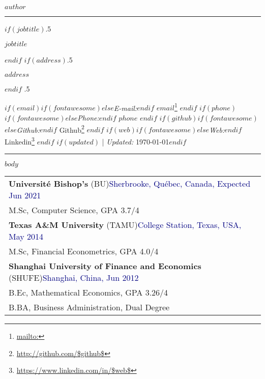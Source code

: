 \documentclass[$if(fontsize)$$fontsize$,$endif$$if(lang)$$babel-lang$,$endif$$if(papersize)$$papersize$paper,$endif$$for(classoption)$$classoption$$sep$,$endfor$]{$documentclass$}
\renewcommand{\href}[2]{#2\footnote{\url{#1}}}
\begin{document}
\centerline{\huge \bf $author$}

\vspace{2 mm}

\hrule

\vspace{2 mm}

$if(jobtitle)$\moveleft.5\hoffset\centerline{$jobtitle$}$endif$
$if(address)$\moveleft.5\hoffset\centerline{$address$}$endif$
\moveleft.5\hoffset\centerline{
$if(email)$$if(fontawesome)$\faEnvelopeO \hspace{1 mm}$else$\emph{E-mail:}$endif$ \href{mailto:}{$email$} \hspace{1 mm}$endif$ $if(phone)$$if(fontawesome)$\faPhone \hspace{1 mm}$else$\emph{Phone:}$endif$  $phone$  \hspace{1 mm} $endif$ $if(github)$$if(fontawesome)$\faGithub \hspace{1 mm}$else$\emph{Github:}$endif$ \href{http://github.com/$github$}{Github} \hspace{1 mm} $endif$ $if(web)$$if(fontawesome)$\faGlobe \hspace{1 mm}$else$\emph{Web:}$endif$ \href{https://www.linkedin.com/in/$web$}{Linkedin}  $endif$
$if(updated)$ | \emph{Updated:} \today$endif$}

\vspace{2 mm}

\hrule


$body$  %



\begin{tabular}{p{19.4cm}}
    \rule{0pt}{2mm} \textbf{Université Bishop's} \small(BU)\normalsize \hfill \textcolor{Navy}{Sherbrooke, Québec, Canada, Expected Jun 2021}\\
    \rule{0pt}{4mm} \hspace{6mm} M.Sc, Computer Science, GPA 3.7/4\\
    \rule{0pt}{4mm} \textbf{Texas A\&M University} \small(TAMU)\normalsize \hfill \textcolor{Navy}{College Station, Texas, USA, May 2014}\\
    \rule{0pt}{4mm} \hspace{6mm} M.Sc, Financial Econometrics, GPA 4.0/4\\
    \rule{0pt}{4mm} \textbf{Shanghai University of Finance and Economics} \small(SHUFE)\normalsize \hfill \textcolor{Navy}{Shanghai, China, Jun 2012}\\
    \rule{0pt}{4mm} \hspace{6mm} B.Ec, Mathematical Economics, GPA 3.26/4\\
    \rule{0pt}{4mm} \hspace{6mm} B.BA, Business Administration, Dual Degree\\
\end{tabular}
\end{document}
